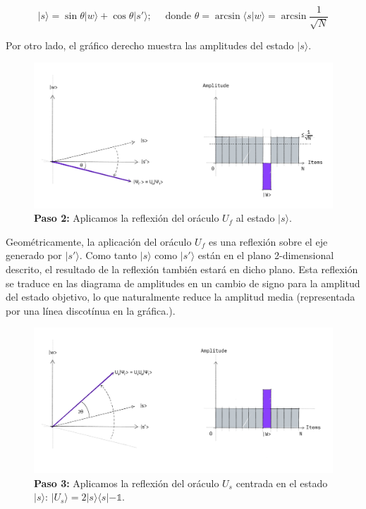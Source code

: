 \documentclass[11pt]{article}
\newcommand{\la}{\langle}
\newcommand{\ra}{\rangle}
\theoremstyle{plain}
\begin{document}
\[
	|s\ra = \sin \theta | w \ra + \cos \theta | s' \ra; \quad \text{ donde } \theta = \arcsin \la s | w \ra = \arcsin \frac{1}{\sqrt{N}}
\]

Por otro lado, el gráfico derecho muestra las amplitudes del estado $|s\ra$.

\begin{figure}[H]
	\centering
	\includegraphics[scale=0.5]{figures/grover_step2}
	\caption{\textbf{Paso 2:} Aplicamos la reflexión del oráculo $U_f$ al estado $|s\ra$.}
\end{figure}

Geométricamente, la aplicación del oráculo $U_f$ es una reflexión sobre el eje generado por $|s'\ra$. Como tanto $|s\ra$ como $|s'\ra$ están en el plano 2-dimensional descrito, el resultado de la reflexión también estará en dicho plano. Esta reflexión se traduce en las diagrama de amplitudes en un cambio de signo para la amplitud del estado objetivo, lo que naturalmente reduce la amplitud media (representada por una línea discotínua en la gráfica.).

\begin{figure}[H]
	\centering
	\includegraphics[scale=0.5]{figures/grover_step3}
	\caption{\textbf{Paso 3:} Aplicamos la reflexión del oráculo $U_s$ centrada en el estado $|s\ra$: $|U_s\ra = 2|s\ra\la s| - \mathbb{1}$.}
\end{figure}
\end{document}
